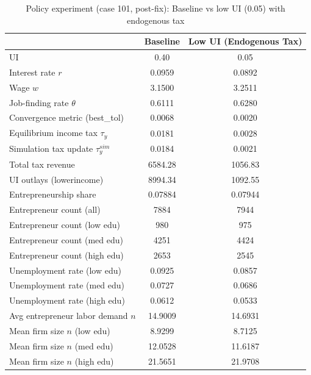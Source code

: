 \begin{table}[H]
\caption{Policy experiment (case 101, post-fix): Baseline vs low UI (0.05) with endogenous tax}
\label{tab:exp_lowui_endogtax_case101_postfix}
\centering
\small
\begin{tabular}{|l|c|c|}
\hline
 & Baseline & Low UI (Endogenous Tax) \\
\hline
UI & 0.40 & 0.05 \\
\hline
Interest rate $r$ & 0.0959 & 0.0892 \\
\hline
Wage $w$ & 3.1500 & 3.2511 \\
\hline
Job-finding rate $\theta$ & 0.6111 & 0.6280 \\
\hline
Convergence metric (best\_tol) & 0.0068 & 0.0020 \\
\hline
Equilibrium income tax $\tau_y$ & 0.0181 & 0.0028 \\
\hline
Simulation tax update $\tau_y^{sim}$ & 0.0184 & 0.0021 \\
\hline
Total tax revenue & 6584.28 & 1056.83 \\
\hline
UI outlays (lowerincome) & 8994.34 & 1092.55 \\
\hline
Entrepreneurship share & 0.07884 & 0.07944 \\
\hline
Entrepreneur count (all) & 7884 & 7944 \\
\hline
Entrepreneur count (low edu) & 980 & 975 \\
\hline
Entrepreneur count (med edu) & 4251 & 4424 \\
\hline
Entrepreneur count (high edu) & 2653 & 2545 \\
\hline
Unemployment rate (low edu) & 0.0925 & 0.0857 \\
\hline
Unemployment rate (med edu) & 0.0727 & 0.0686 \\
\hline
Unemployment rate (high edu) & 0.0612 & 0.0533 \\
\hline
Avg entrepreneur labor demand $n$ & 14.9009 & 14.6931 \\
\hline
Mean firm size $n$ (low edu) & 8.9299 & 8.7125 \\
\hline
Mean firm size $n$ (med edu) & 12.0528 & 11.6187 \\
\hline
Mean firm size $n$ (high edu) & 21.5651 & 21.9708 \\
\hline
\end{tabular}
\end{table}
